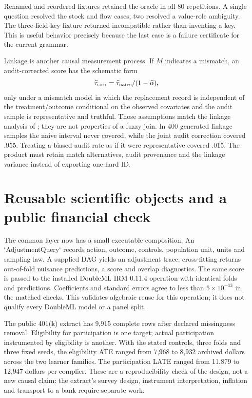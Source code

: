 Renamed and reordered fixtures retained the oracle in all 80 repetitions. A
single question resolved the stock and flow cases; two resolved a value-role
ambiguity. The three-field-key fixture returned incompatible rather than
inventing a key. This is useful behavior precisely because the last case is a
failure certificate for the current grammar.

Linkage is another causal measurement process. If $M$ indicates a mismatch,
an audit-corrected score has the schematic form
\[
 \widehat\tau_{\rm corr}=\widehat\tau_{\rm naive}/(1-\widehat\alpha),
\]
only under a mismatch model in which the replacement record is independent
of the treatment/outcome conditional on the observed covariates and the audit
sample is representative and truthful. Those assumptions match the linkage
analysis of \citet{slawski2025}; they are not properties of a fuzzy join.
In 400 generated linkage samples the naive interval never covered, while the
joint audit correction covered .955. Treating a biased audit rate as if it
were representative covered .015. The product must retain match alternatives,
audit provenance and the linkage variance instead of exporting one hard ID.

\section{Reusable scientific objects and a public financial check}
\label{s5:composition}

The common layer now has a small executable composition. An
`AdjustmentQuery` records action, outcome, controls, population unit, units
and sampling law. A supplied DAG yields an adjustment trace; cross-fitting
returns out-of-fold nuisance predictions, a score and overlap diagnostics.
The same score is passed to the installed DoubleML IRM 0.11.4 operation with
identical folds and predictions. Coefficients and standard errors agree to
less than $5\times10^{-13}$ in the matched checks. This validates algebraic
reuse for this operation; it does not qualify every DoubleML model or a panel
split.

The public 401(k) extract has 9,915 complete rows after declared missingness
removal. Eligibility for participation is one target; actual participation
instrumented by eligibility is another. With the stated controls, three folds
and three fixed seeds, the eligibility ATE ranged from 7,968 to 8,932 archived
dollars across the two learner families. The participation LATE ranged from
11,879 to 12,947 dollars per complier. These are a reproducibility check of
the design, not a new causal claim: the extract's survey design, instrument
interpretation, inflation and transport to a bank require separate work.

